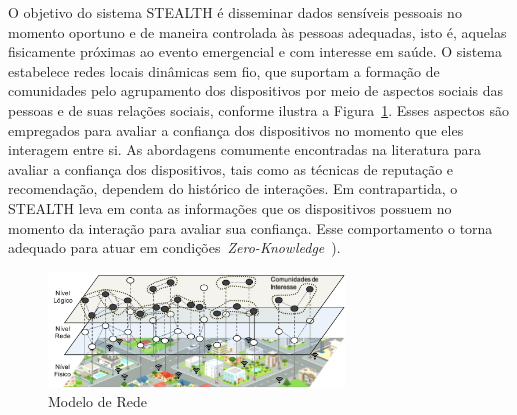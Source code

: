 \documentclass[12pt]{article}
\begin{document}
O objetivo do sistema \mbox{STEALTH} é disseminar dados sensíveis pessoais no momento oportuno e de maneira controlada às pessoas adequadas, isto é, aquelas fisicamente próximas ao evento emergencial e com interesse em saúde. O sistema estabelece redes locais dinâmicas sem fio, que suportam a formação de comunidades pelo agrupamento dos dispositivos por meio de aspectos sociais das pessoas e de suas relações sociais, conforme ilustra a Figura~\ref{fig:modeloRede}. Esses aspectos são empregados para avaliar a confiança dos dispositivos no momento que eles interagem entre si. As abordagens comumente encontradas na literatura para avaliar a confiança dos dispositivos, tais como as técnicas de reputação e recomendação, dependem do histórico de interações. Em contrapartida, o STEALTH leva em conta as informações que os dispositivos possuem no momento da interação para avaliar sua confiança. Esse comportamento o torna adequado para atuar em condições~\textit{Zero-Knowledge}~\cite{feige1988zero,kim2015hcs}).

\begin{figure}[H]
\centering
\includegraphics[width=0.7\textwidth]{figures/ModeloRede.pdf}
\caption{Modelo de Rede}
\label{fig:modeloRede}
\end{figure}
\end{document}
